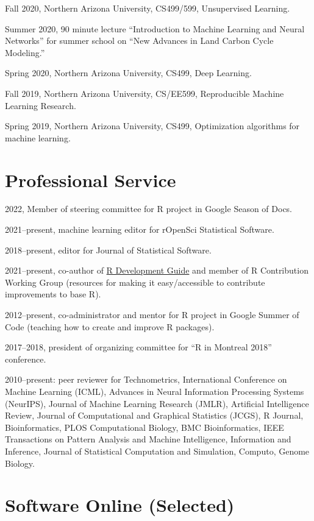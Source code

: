 \documentclass[margin,line]{res}
\begin{document}
\begin{resume}
Fall 2020, Northern Arizona University, CS499/599, Unsupervised
Learning.

Summer 2020, 90 minute lecture ``Introduction to Machine Learning and
Neural Networks'' for summer school on ``New Advances in Land Carbon
Cycle Modeling.''

Spring 2020, Northern Arizona University, CS499, Deep Learning.

Fall 2019, Northern Arizona University, CS/EE599, Reproducible Machine
Learning Research.

Spring 2019, Northern Arizona University, CS499, Optimization
algorithms for machine learning.

\section{\sc Professional Service}

2022, Member of steering committee for R project in Google Season of Docs.

2021--present, machine learning editor for rOpenSci Statistical Software.

2018--present, editor for Journal of Statistical Software.

2021--present, co-author of
\href{https://contributor.r-project.org/rdevguide/}{R Development
  Guide} and member of R Contribution Working Group (resources for
making it easy/accessible to contribute improvements to base R).

2012--present, co-administrator and mentor for R project in Google
Summer of Code (teaching how to create and improve R packages).

2017--2018, president of organizing committee for ``R in Montreal
2018'' conference.

2010--present: peer reviewer for Technometrics, International
Conference on Machine Learning (ICML), Advances in Neural Information
Processing Systems (NeurIPS), Journal of Machine Learning Research
(JMLR), Artificial Intelligence Review, Journal of Computational and
Graphical Statistics (JCGS), R Journal, Bioinformatics, PLOS
Computational Biology, BMC Bioinformatics, IEEE Transactions on
Pattern Analysis and Machine Intelligence, Information and Inference,
Journal of Statistical Computation and Simulation, Computo, Genome
Biology.

\section{\sc Software Online (Selected)} 


\end{resume}
\end{document}

